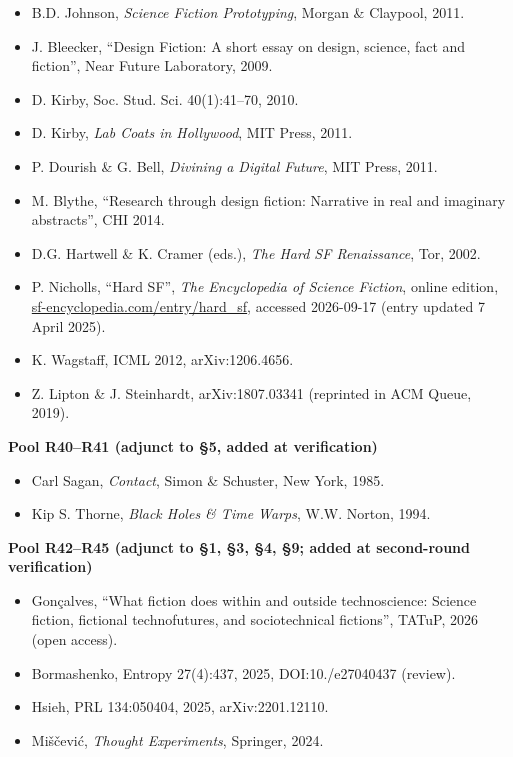 \documentclass[11pt,a4paper]{article}
\begin{document}
\begin{itemize}[leftmargin=1.6em,itemsep=2pt,parsep=0pt,topsep=3pt]
\item[R30.] B.D. Johnson, \textit{Science Fiction Prototyping}, Morgan \& Claypool, 2011.
\item[R31.] J. Bleecker, ``Design Fiction: A short essay on design, science, fact and fiction'', Near Future Laboratory, 2009.
\item[R32.] D. Kirby, Soc. Stud. Sci. 40(1):41–70, 2010.
\item[R33.] D. Kirby, \textit{Lab Coats in Hollywood}, MIT Press, 2011.
\item[R34.] P. Dourish \& G. Bell, \textit{Divining a Digital Future}, MIT Press, 2011.
\item[R35.] M. Blythe, ``Research through design fiction: Narrative in real and imaginary abstracts'', CHI 2014.
\item[R36.] D.G. Hartwell \& K. Cramer (eds.), \textit{The Hard SF Renaissance}, Tor, 2002.
\item[R37.] P. Nicholls, ``Hard SF'', \textit{The Encyclopedia of Science Fiction}, online edition, \url{sf-encyclopedia.com/entry/hard_sf}, accessed 2026-09-17 (entry updated 7 April 2025).
\item[R38.] K. Wagstaff, ICML 2012, arXiv:1206.4656.
\item[R39.] Z. Lipton \& J. Steinhardt, arXiv:1807.03341 (reprinted in ACM Queue, 2019).
\end{itemize}

\medskip
\noindent\textbf{Pool R40–R41 (adjunct to §5, added at verification)}\par\addvspace{2pt}

\begin{itemize}[leftmargin=1.6em,itemsep=2pt,parsep=0pt,topsep=3pt]
\item[R40.] Carl Sagan, \textit{Contact}, Simon \& Schuster, New York, 1985.
\item[R41.] Kip S. Thorne, \textit{Black Holes \& Time Warps}, W.W. Norton, 1994.
\end{itemize}

\medskip
\noindent\textbf{Pool R42–R45 (adjunct to §1, §3, §4, §9; added at second-round verification)}\par\addvspace{2pt}

\begin{itemize}[leftmargin=1.6em,itemsep=2pt,parsep=0pt,topsep=3pt]
\item[R42.] Gonçalves, ``What fiction does within and outside technoscience: Science fiction, fictional technofutures, and sociotechnical fictions'', TATuP, 2026 (open access).
\item[R43.] Bormashenko, Entropy 27(4):437, 2025, DOI:10./\allowbreak e27040437 (review).
\item[R44.] Hsieh, PRL 134:050404, 2025, arXiv:2201.12110.
\item[R45.] Miščević, \textit{Thought Experiments}, Springer, 2024.
\end{itemize}
\end{document}
